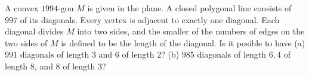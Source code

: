 A convex $1994$-gon $M$ is given in the plane. A closed polygonal line consists of $997$ of its diagonals. Every vertex is adjacent to exactly one diagonal. Each diagonal divides $M$ into two sides, and the smaller of the numbers of edges on the two sides of $M$ is defined to be the length of the diagonal. Is it posible to have
(a) $991$ diagonals of length $3$ and $6$ of length $2$?
(b) $985$ diagonals of length $6, 4$ of length $8$, and $8$ of length $3$?